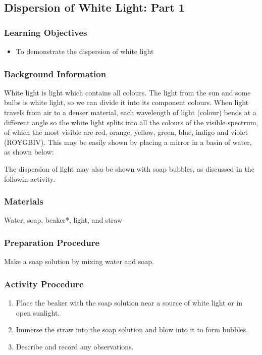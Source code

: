 \subsection{Dispersion of White Light: Part 1}

\subsubsection*{Learning Objectives}
\begin{itemize}
\item{To demonstrate the dispersion of white light} 
\end{itemize}

\subsubsection*{Background Information}
White light is light which contains all colours.  The light from the sun and some bulbs is white light, so we can divide it into its component colours.  When light travels from air to a denser material, each wavelength of light (colour) bends at a different angle so the white light splits into all the colours of the visible spectrum, of which the most visible are red, orange, yellow, green, blue, indigo and violet (ROYGBIV). This may be easily shown by placing a mirror in a basin of water, as shown below:


%

The dispersion of light may also be shown with soap bubbles, as discussed in the followin activity.

\subsubsection*{Materials}
Water, soap, beaker*, light, and straw

\subsubsection*{Preparation Procedure}
Make a soap solution by mixing water and soap.

\subsubsection*{Activity Procedure}
\begin{enumerate}
\item{Place the beaker with the soap solution near a source of white light or in open sunlight.} 
\item{Immerse the straw into the soap solution and blow into it to form bubbles.} 
\item{Describe and record any observations.} 
\end{enumerate}

